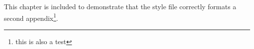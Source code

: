 This chapter is included to demonstrate that the style file correctly formats a second appendix\footnote{this is also a test}.